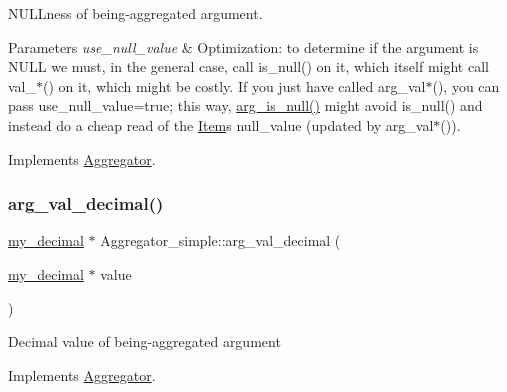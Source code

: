 N\+U\+L\+Lness of being-\/aggregated argument.


\begin{DoxyParams}{Parameters}
{\em use\+\_\+null\+\_\+value} & Optimization\+: to determine if the argument is N\+U\+LL we must, in the general case, call is\+\_\+null() on it, which itself might call val\+\_\+$\ast$() on it, which might be costly. If you just have called arg\+\_\+val$\ast$(), you can pass use\+\_\+null\+\_\+value=true; this way, \mbox{\hyperlink{classAggregator__simple_a89edab7b2334ef55dd1848094cdb4331}{arg\+\_\+is\+\_\+null()}} might avoid is\+\_\+null() and instead do a cheap read of the \mbox{\hyperlink{classItem}{Item}}\textquotesingle{}s null\+\_\+value (updated by arg\+\_\+val$\ast$()). \\
\hline
\end{DoxyParams}


Implements \mbox{\hyperlink{classAggregator_a2581c04dee61cf1a4d72519da64baf53}{Aggregator}}.

\mbox{\label{classAggregator__simple_aeaf3d769df20c4c91476dd661da758f7}} 
\subsubsection{\texorpdfstring{arg\+\_\+val\+\_\+decimal()}{arg\_val\_decimal()}}
{\footnotesize\ttfamily \mbox{\hyperlink{classmy__decimal}{my\+\_\+decimal}} $\ast$ Aggregator\+\_\+simple\+::arg\+\_\+val\+\_\+decimal (\begin{DoxyParamCaption}\item[{\mbox{\hyperlink{classmy__decimal}{my\+\_\+decimal}} $\ast$}]{value }\end{DoxyParamCaption})\hspace{0.3cm}{\ttfamily [virtual]}}

Decimal value of being-\/aggregated argument 

Implements \mbox{\hyperlink{classAggregator_a0965a66058cd00c581b015b9c571cb07}{Aggregator}}.

\mbox{\label{classAggregator__simple_adaa482bd0ba91275f559a4eae95686c0}} 
